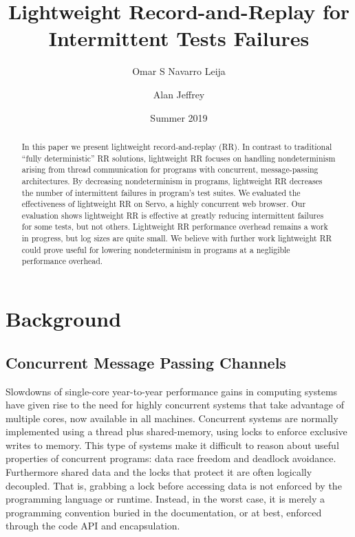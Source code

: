 \documentclass{article}
\begin{document}
\title{Lightweight Record-and-Replay for Intermittent Tests Failures}
\author[1]{Omar S Navarro Leija}
\author[2]{Alan Jeffrey}
\date{Summer 2019}
\maketitle

\begin{abstract}
In this paper we present lightweight record-and-replay (RR). In contrast to traditional ``fully deterministic'' RR solutions, lightweight RR focuses on handling nondeterminism arising from thread communication for programs with concurrent, message-passing architectures. By decreasing nondeterminism in programs, lightweight RR decreases the number of intermittent failures in program's test suites. We evaluated the effectiveness of lightweight RR on Servo, a highly concurrent web browser. Our evaluation shows lightweight RR is effective at greatly reducing intermittent failures for some tests, but not others. Lightweight RR performance overhead remains a work in progress, but log sizes are quite small. We believe with further work lightweight RR could prove useful for lowering nondeterminism in programs at a negligible performance overhead.
\end{abstract}

\section{Background}

\subsection{Concurrent Message Passing Channels}
Slowdowns of single-core year-to-year performance gains in computing systems have given rise to the need
for highly concurrent systems that take advantage of multiple cores, now available
in all machines.
Concurrent systems are normally implemented using a thread plus shared-memory,
using locks to enforce exclusive writes to memory. This type of systems make
it difficult to reason about useful properties of concurrent programs:
data race freedom and deadlock avoidance.
Furthermore shared data and the locks that protect it are often logically decoupled. That is,
grabbing a lock before accessing data is not enforced by the programming language or runtime.
Instead, in the worst case, it is merely a programming convention buried in the documentation,
or at best, enforced through the code API and encapsulation.
\end{document}
